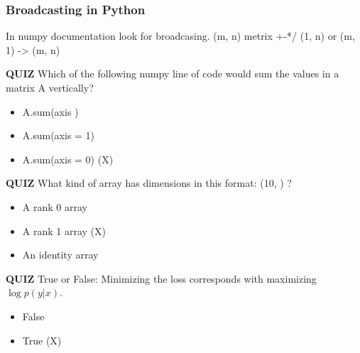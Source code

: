 \subsubsection*{Broadcasting in Python}
In numpy documentation look for broadcasing. (m, n) metrix +-*/ (1, n) or (m, 1) -> (m, n)

\textbf{QUIZ} Which of the following numpy line of code would sum the values in a matrix A vertically?
\begin{itemize}
    \item A.sum(axis )
    \item A.sum(axis = 1)
    \item A.sum(axis = 0) (X)
\end{itemize}
\textbf{QUIZ} What kind of array has dimensions in this format: (10, ) ?
\begin{itemize}
    \item A rank 0 array
    \item A rank 1 array (X)
    \item An identity array
\end{itemize}
\textbf{QUIZ} True or False: Minimizing the loss corresponds with maximizing $\log p(y|x)$.
\begin{itemize}
    \item False
    \item True (X)
\end{itemize}

